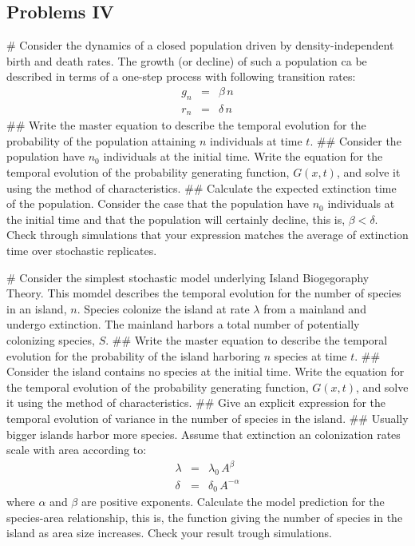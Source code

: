 \subsection*{Problems IV} 

\begin{easylist}[enumerate]
# Consider the dynamics of a closed population driven by density-independent birth and death rates. The growth (or decline) of such a population ca be described in terms of a one-step process with following transition rates:
\begin{eqnarray}
g_n & = & \beta\,n  \nonumber \\ 
r_n & = & \delta\,n \nonumber
\end{eqnarray}
## Write the master equation to describe the temporal evolution for the probability of the population attaining $n$ individuals at time $t$. 
## Consider the population have $n_0$ individuals at the initial time. Write the equation for the temporal evolution of the probability generating function, $G(x,t)$, and solve it using the method of characteristics. 
## Calculate the expected extinction time of the population. Consider the case that the population have $n_0$ individuals at the initial time and that the population will certainly decline, this is, $\beta < \delta$. Check through simulations that your expression matches the average of extinction time over stochastic replicates. 

# Consider the simplest stochastic model underlying Island Biogegoraphy Theory. This momdel describes the temporal evolution for the number of species in an island, $n$. Species colonize the island at rate $\lambda$ from a mainland and undergo extinction. The mainland harbors a total number of potentially colonizing species, $S$.   
## Write the master equation to describe the temporal evolution for the probability of the island harboring $n$ species at time $t$. 
## Consider the island contains no species at the initial time. Write the equation for the temporal evolution of the probability generating function, $G(x,t)$, and solve it using the method of characteristics.
## Give an explicit expression for the temporal evolution of variance in the number of species in the island.
## Usually bigger islands harbor more species. Assume that extinction an colonization rates scale with area according to:
\begin{eqnarray}
\lambda & = & \lambda_0\, A^{\beta}   \nonumber \\ 
\delta  & = & \delta_0 \, A^{-\alpha} \nonumber  
\end{eqnarray}
where $\alpha$ and $\beta$ are positive exponents. Calculate the model prediction for the species-area relationship, this is, the function giving the number of species in the island as area size increases. Check your result trough simulations.   
\end{easylist}
